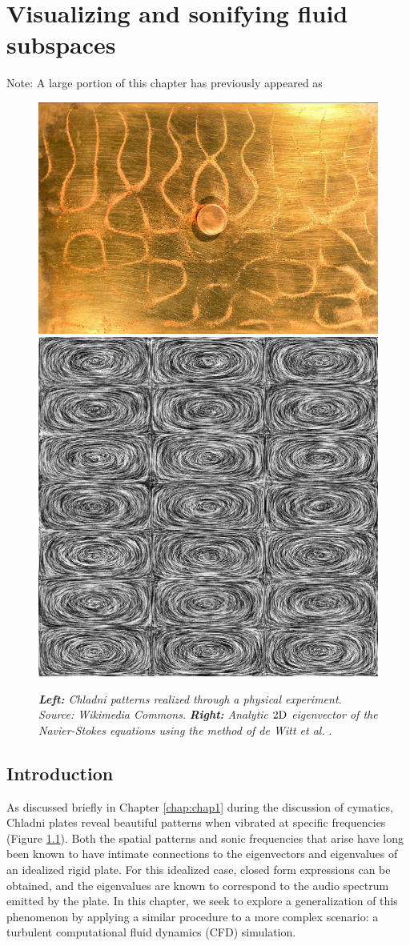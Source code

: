 \chapter[Visualizing and sonifying fluid subspaces]{Visualizing and sonifying fluid subspaces}
\label{chap:chap5}

Note: A large portion of this chapter has previously appeared as \cite{bridges2017:305}
\bigskip\bigskip

\begin{figure}[H]
		\centering
		\includegraphics[height=0.3\textwidth]{chap5/figures/chladni_plate.jpg}
		\includegraphics[height=0.3\textwidth]{chap5/figures/LIC.jpg}
		\caption{{\em{\bf Left:} Chladni patterns realized through a physical experiment. Source: Wikimedia Commons.} {\em{\bf Right:} Analytic $2\textnormal{D}$ eigenvector of the Navier-Stokes equations using the method of de Witt et al.} \cite{deWitt:2012}.}
		\label{fig:chladni-plate}
\end{figure}

\section{Introduction}
As discussed briefly in Chapter \ref{chap:chap1} during the discussion of cymatics, Chladni plates reveal beautiful patterns when vibrated at specific frequencies (Figure \ref{fig:chladni-plate}). Both the spatial patterns and sonic frequencies that arise have long been known to have intimate connections to the eigenvectors and eigenvalues of an idealized rigid plate. For this idealized case, closed form expressions can be obtained, and the eigenvalues are known to correspond to the audio spectrum emitted by the plate. In this chapter, we seek to explore a generalization of this phenomenon by applying a similar procedure to a more complex scenario: a turbulent computational fluid dynamics (CFD) simulation. 

